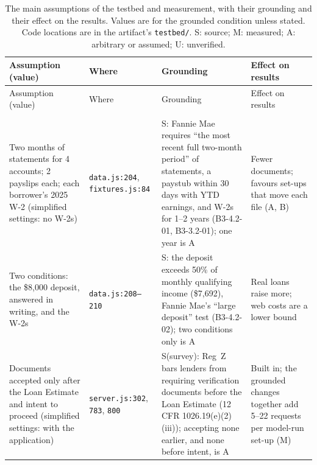 %
{\footnotesize
\setlength{\tabcolsep}{3pt}
\renewcommand{\arraystretch}{1.08}
\providecommand{\RR}{\raggedright\hspace{0pt}}
\begin{longtable}{@{}p{1.70in}p{0.95in}p{2.45in}p{1.10in}@{}}
\caption{The main assumptions of the testbed and measurement, with their grounding and their effect on the results. Values are for the grounded condition unless stated. Code locations are in the artifact's \texttt{testbed/}. S: source; M: measured; A: arbitrary or assumed; U: unverified.}\label{tab:assumptions}\tabularnewline
\toprule
Assumption (value) & Where & Grounding & Effect on results \tabularnewline
\midrule
\endfirsthead
\toprule
Assumption (value) & Where & Grounding & Effect on results \tabularnewline
\midrule
\endhead
\bottomrule
\endfoot
\multicolumn{4}{@{}l}{\emph{Task and documents}}\tabularnewline
\RR Two months of statements for 4 accounts; 2 payslips each; each borrower's 2025 W-2 (simplified settings: no W-2s) & \RR\texttt{data.js:204}, \texttt{fixtures.js:84} & \RR S: Fannie Mae requires ``the most recent full two-month period'' of statements, a paystub within 30 days with YTD earnings, and W-2s for 1--2 years (B3-4.2-01, B3-3.2-01); one year is A & \RR Fewer documents; favours set-ups that move each file (A, B) \tabularnewline
\RR Two conditions: the \$8{,}000 deposit, answered in writing, and the W-2s & \RR\texttt{data.js:}\allowbreak\texttt{208--210} & \RR S: the deposit exceeds 50\% of monthly qualifying income (\$7{,}692), Fannie Mae's ``large deposit'' test (B3-4.2-02); two conditions only is A & \RR Real loans raise more; web costs are a lower bound \tabularnewline
\RR Documents accepted only after the Loan Estimate and intent to proceed (simplified settings: with the application) & \RR\texttt{server.js:302}, \texttt{783}, \texttt{800} & \RR S(survey): Reg~Z bars lenders from requiring verification documents before the Loan Estimate (12 CFR 1026.19(e)(2)(iii)); accepting none earlier, and none before intent, is A & \RR Built in; the grounded changes together add 5--22 requests per model-run set-up (M) \tabularnewline

\end{longtable}}
